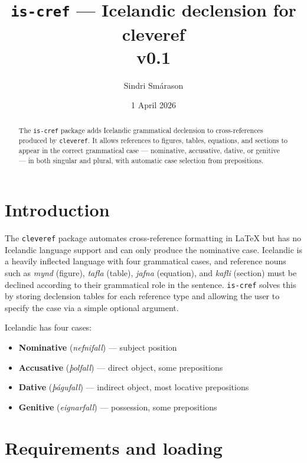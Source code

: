 \documentclass{article}
\title{\texttt{is-cref} --- Icelandic declension for cleveref\\
  \large v0.1}
\author{Sindri Smárason}
\date{1 April 2026}
\begin{document}
\maketitle

\begin{abstract}
  The \texttt{is-cref} package adds Icelandic grammatical declension to
  cross-references produced by \texttt{cleveref}. It allows references
  to figures, tables, equations, and sections to appear in the correct
  grammatical case --- nominative, accusative, dative, or genitive ---
  in both singular and plural, with automatic case selection from
  prepositions.
\end{abstract}

\tableofcontents
\newpage

\section{Introduction}

The \texttt{cleveref} package automates cross-reference formatting in
LaTeX but has no Icelandic language support and can only produce the
nominative case. Icelandic is a heavily inflected language with four
grammatical cases, and reference nouns such as \textit{mynd} (figure),
\textit{tafla} (table), \textit{jafna} (equation), and \textit{kafli}
(section) must be declined according to their grammatical role in the
sentence. \texttt{is-cref} solves this by storing declension tables for
each reference type and allowing the user to specify the case via a
simple optional argument.

Icelandic has four cases:
\begin{itemize}
  \item \textbf{Nominative} (\textit{nefnifall}) --- subject position
  \item \textbf{Accusative} (\textit{þolfall}) --- direct object, some prepositions
  \item \textbf{Dative} (\textit{þágufall}) --- indirect object, most locative prepositions
  \item \textbf{Genitive} (\textit{eignarfall}) --- possession, some prepositions
\end{itemize}

\section{Requirements and loading}
\end{document}
